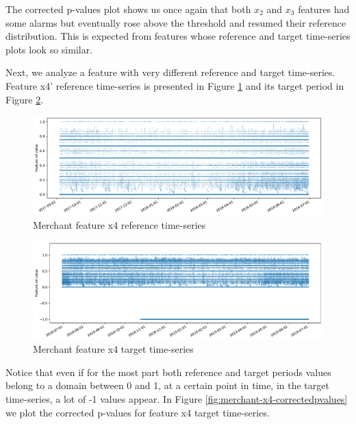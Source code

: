 The corrected p-values plot shows us once again that both $x_2$ and $x_3$ features had some alarms but eventually rose above the threshold and resumed their reference distribution. This is expected from features whose reference and target time-series plots look so similar.

Next, we analyze a feature with very different reference and target time-series. Feature x4' reference time-series is presented in Figure \ref{fig:merchant-x4-reference} and its target period in Figure \ref{fig:merchant-x4-target}.
\begin{figure}[!htb]
    \begin{center}
      \includegraphics[scale=0.5]{figures/merchant-x4-reference.pdf}
      \caption{Merchant feature x4 reference time-series}
      \label{fig:merchant-x4-reference}
    \end{center}
\end{figure}
\begin{figure}[!htb]
    \begin{center}
      \includegraphics[scale=0.5]{figures/merchant-x4-target.pdf}
      \caption{Merchant feature x4 target time-series}
      \label{fig:merchant-x4-target}
    \end{center}
\end{figure}
Notice that even if for the most part both reference and target periods values belong to a domain between 0 and 1, at a certain point in time, in the target time-series, a lot of -1 values appear. In Figure \ref{fig:merchant-x4-correctedpvalues} we plot the corrected p-values for feature x4 target time-series.
